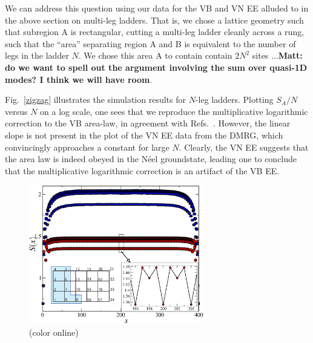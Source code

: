 \documentclass[prl,aps,twocolumn,floatfix,amsmath,amssymb,superscriptaddress,tightenlines]{revtex4}
\begin{document}
We can address this question using our data for the VB and VN EE alluded to in the above section on multi-leg ladders.  That is, we chose a lattice geometry such that subregion A is rectangular, cutting a multi-leg ladder cleanly across a rung, such that the ``area'' separating region A and B is equivalent to the number of legs in the ladder $N$.  We chose this area A to contain contain $2N^2$ sites ...{\bf Matt: do we want to spell out the argument involving the sum over quasi-1D modes?  I think we will have room}.

Fig.~\ref{zigzag} illustrates the simulation results for $N$-leg ladders.  Plotting $S_A/N$ versus $N$ on a log scale, one sees that we reproduce the multiplicative logarithmic correction to the VB area-law, in agreement with Refs.~\cite{Alet,Chh}.  However, the linear slope is not present in the plot of the VN EE data from the DMRG, which convincingly approaches a constant for large $N$.  Clearly, the VN EE suggests that the area law is indeed obeyed in the N\'eel groundstate, leading one to conclude that the multiplicative logarithmic correction is an artifact of the VB EE.


\begin{figure}
{
\includegraphics[width=3in]{FIG2.eps}
\caption{(color online) 
\label{ladder}}}
\end{figure}
\end{document}
